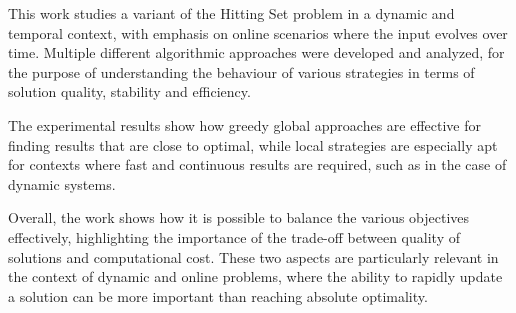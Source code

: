 \documentclass[11pt]{article}
\begin{document}
This work studies a variant of the Hitting Set problem in a dynamic and temporal context, with emphasis on online scenarios where the input evolves over time. Multiple different algorithmic approaches were developed and analyzed, for the purpose of understanding the behaviour of various strategies in terms of solution quality, stability and efficiency.

The experimental results show how greedy global approaches are effective for finding results that are close to optimal, while local strategies are especially apt for contexts where fast and continuous results are required, such as in the case of dynamic systems.

Overall, the work shows how it is possible to balance the various objectives effectively, highlighting the importance of the trade-off between quality of solutions and computational cost. These two aspects are particularly relevant in the context of dynamic and online problems, where the ability to rapidly update a solution can be more important than reaching absolute optimality.



\end{document}
